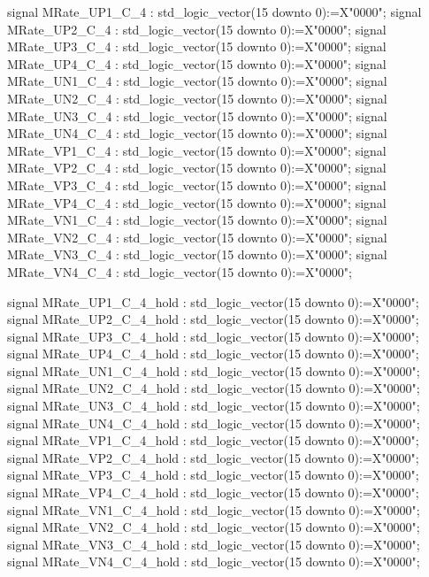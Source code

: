 \begin{mylisting}[language=VHDL,caption=ゲート信号出力モジュール,label=MMC_PWM_GEN_module_VHDL]
	signal 	MRate_UP1_C_4					: std_logic_vector(15 downto 0):=X"0000";
	signal 	MRate_UP2_C_4					: std_logic_vector(15 downto 0):=X"0000";
	signal 	MRate_UP3_C_4					: std_logic_vector(15 downto 0):=X"0000";
	signal 	MRate_UP4_C_4					: std_logic_vector(15 downto 0):=X"0000";
	signal 	MRate_UN1_C_4					: std_logic_vector(15 downto 0):=X"0000";
	signal 	MRate_UN2_C_4					: std_logic_vector(15 downto 0):=X"0000";
	signal 	MRate_UN3_C_4					: std_logic_vector(15 downto 0):=X"0000";
	signal 	MRate_UN4_C_4					: std_logic_vector(15 downto 0):=X"0000";
	signal 	MRate_VP1_C_4					: std_logic_vector(15 downto 0):=X"0000";
	signal 	MRate_VP2_C_4					: std_logic_vector(15 downto 0):=X"0000";
	signal 	MRate_VP3_C_4					: std_logic_vector(15 downto 0):=X"0000";
	signal 	MRate_VP4_C_4					: std_logic_vector(15 downto 0):=X"0000";
	signal 	MRate_VN1_C_4					: std_logic_vector(15 downto 0):=X"0000";
	signal 	MRate_VN2_C_4					: std_logic_vector(15 downto 0):=X"0000";
	signal 	MRate_VN3_C_4					: std_logic_vector(15 downto 0):=X"0000";
	signal 	MRate_VN4_C_4					: std_logic_vector(15 downto 0):=X"0000";

	signal 	MRate_UP1_C_4_hold					: std_logic_vector(15 downto 0):=X"0000";
	signal 	MRate_UP2_C_4_hold					: std_logic_vector(15 downto 0):=X"0000";
	signal 	MRate_UP3_C_4_hold					: std_logic_vector(15 downto 0):=X"0000";
	signal 	MRate_UP4_C_4_hold					: std_logic_vector(15 downto 0):=X"0000";
	signal 	MRate_UN1_C_4_hold					: std_logic_vector(15 downto 0):=X"0000";
	signal 	MRate_UN2_C_4_hold					: std_logic_vector(15 downto 0):=X"0000";
	signal 	MRate_UN3_C_4_hold					: std_logic_vector(15 downto 0):=X"0000";
	signal 	MRate_UN4_C_4_hold					: std_logic_vector(15 downto 0):=X"0000";
	signal 	MRate_VP1_C_4_hold					: std_logic_vector(15 downto 0):=X"0000";
	signal 	MRate_VP2_C_4_hold					: std_logic_vector(15 downto 0):=X"0000";
	signal 	MRate_VP3_C_4_hold					: std_logic_vector(15 downto 0):=X"0000";
	signal 	MRate_VP4_C_4_hold					: std_logic_vector(15 downto 0):=X"0000";
	signal 	MRate_VN1_C_4_hold					: std_logic_vector(15 downto 0):=X"0000";
	signal 	MRate_VN2_C_4_hold					: std_logic_vector(15 downto 0):=X"0000";
	signal 	MRate_VN3_C_4_hold					: std_logic_vector(15 downto 0):=X"0000";
	signal 	MRate_VN4_C_4_hold					: std_logic_vector(15 downto 0):=X"0000";


\end{mylisting}
